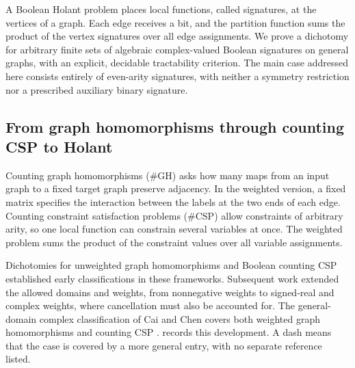 \documentclass[11pt,letterpaper,onecolumn]{article}
\theoremstyle{plain}
\theoremstyle{definition}
\theoremstyle{remark}
\begin{document}
A Boolean Holant problem places local functions, called signatures, at
the vertices of a graph. Each edge receives a bit, and the partition
function sums the product of the vertex signatures over all edge
assignments. We prove a dichotomy for arbitrary finite sets of algebraic
complex-valued Boolean signatures on general graphs, with an explicit,
decidable tractability criterion. The main case addressed here consists
entirely of even-arity signatures, with neither a symmetry restriction nor
a prescribed auxiliary binary signature.

\subsection{From graph homomorphisms through counting CSP to Holant}
\label{short:subsec:intro-history}

Counting graph homomorphisms (\(\#\mathrm{GH}\)) asks how many maps from an
input graph to a fixed target graph preserve adjacency.  In the weighted
version, a fixed matrix specifies the interaction between the labels at
the two ends of each edge.  Counting constraint satisfaction problems
(\(\#\mathrm{CSP}\)) allow constraints of arbitrary arity, so one local
function can constrain several variables at once.  The weighted problem
sums the product of the constraint values over all variable assignments.

Dichotomies for unweighted graph homomorphisms and Boolean counting CSP
\cite{DyerGreenhill2000,CreignouHermann1996} established early classifications
in these frameworks.  Subsequent work extended the allowed domains and
weights, from nonnegative weights to signed-real and complex weights,
where cancellation must also be accounted for.  The general-domain complex
classification of Cai and Chen covers both weighted graph homomorphisms
and counting CSP \cite{CaiChen2017}.
 records this development.  A dash means that
the case is covered by a more general entry, with no separate reference
listed.
\end{document}
